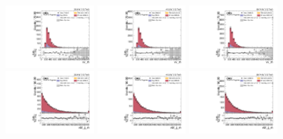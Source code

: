 \begin{figure}[!ht]
  \centering
  \includegraphics[width=0.30\textwidth]{analysis_plots/2016_zjj/cr_vjets_l/vv_m.pdf} \hspace{-10pt}
  \includegraphics[width=0.30\textwidth]{analysis_plots/2017_zjj/cr_vjets_l/vv_m.pdf} \hspace{-10pt}
  \includegraphics[width=0.30\textwidth]{analysis_plots/2018_zjj/cr_vjets_l/vv_m.pdf} \hspace{-10pt}  \\
  \includegraphics[width=0.30\textwidth]{analysis_plots/2016_zjj/cr_vjets_l/vbf_jj_m.pdf} \hspace{-10pt}
  \includegraphics[width=0.30\textwidth]{analysis_plots/2017_zjj/cr_vjets_l/vbf_jj_m.pdf} \hspace{-10pt}
  \includegraphics[width=0.30\textwidth]{analysis_plots/2018_zjj/cr_vjets_l/vbf_jj_m.pdf} \hspace{-10pt} \\

\end{figure}
